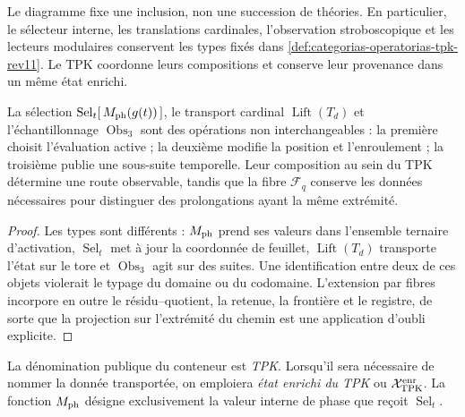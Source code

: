 Le diagramme fixe une inclusion, non une succession de théories. En particulier,
le sélecteur interne, les translations cardinales, l'observation
stroboscopique et les lecteurs modulaires conservent les types fixés dans
\cref{def:categorias-operatorias-tpk-rev11}. Le TPK coordonne leurs compositions
et conserve leur provenance dans un même état enrichi.

\begin{proposition}
\label{prop:tpk-separacion-operadores-rev11}
La sélection \(\operatorname{Sel}_t[\,M_{\rm ph}(g(t))\,]\), le transport
cardinal \(\operatorname{Lift}(T_d)\) et l'échantillonnage
\(\operatorname{Obs}_3\) sont des opérations non interchangeables : la première choisit
l'évaluation active ; la deuxième modifie la position et l'enroulement ; la
troisième publie une sous-suite temporelle. Leur composition au sein du TPK
détermine une route observable, tandis que la fibre \(\mathcal F_q\) conserve
les données nécessaires pour distinguer des prolongations ayant la même extrémité.
\end{proposition}

\begin{proof}
Les types sont différents : \(M_{\rm ph}\) prend ses valeurs dans l'ensemble ternaire
d'activation, \(\operatorname{Sel}_t\) met à jour la coordonnée de feuillet,
\(\operatorname{Lift}(T_d)\) transporte l'état sur le tore et
\(\operatorname{Obs}_3\) agit sur des suites. Une identification entre deux
de ces objets violerait le typage du domaine ou du codomaine. L'extension par fibres
incorpore en outre le résidu--quotient, la retenue, la frontière et le registre, de sorte
que la projection sur l'extrémité du chemin est une application d'oubli explicite.
\end{proof}

\begin{statusbox}[title={Nomenclature canonique}]
La dénomination publique du conteneur est \emph{TPK}. Lorsqu'il sera nécessaire de
nommer la donnée transportée, on emploiera \emph{état enrichi du TPK} ou
\(\mathcal X_{\rm TPK}^{\rm enr}\). La fonction \(M_{\rm ph}\) désigne
exclusivement la valeur interne de phase que reçoit
\(\operatorname{Sel}_t\).
\end{statusbox}
